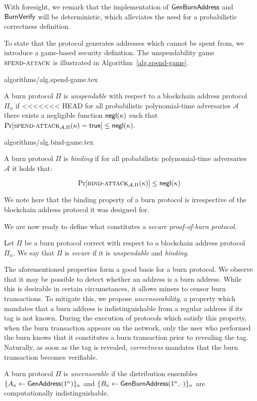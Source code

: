With foresight, we remark that the implementation of $\mathsf{Gen}\-\mathsf{Burn}\-\mathsf{Address}$ and $\mathsf{BurnVerify}$ will be deterministic, which alleviates the need for a probabilistic correctness definition.

To state that the protocol generates addresses which cannot be spent from, we introduce a game-based security definition. The unspendability game $\textsc{spend}\-\text{-}\-\textsc{attack}$ is illustrated in Algorithm~\ref{alg.spend-game}.

{algorithms/alg.spend-game.tex}

\begin{definition}[Unspendability]
  A burn protocol $\Pi$ is \emph{unspendable} with respect to a blockchain address protocol $\Pi_\alpha$ if
<<<<<<< HEAD
  for all probabilistic polynomial-time adversaries $\mathcal{A}$ there exists a negligible function $\textsf{negl}(\kappa)$ such that
  $
    \Pr[\textsc{spend}\-\text{-}\-\textsc{attack}_{\mathcal{A}, \Pi}(\kappa) = \textsf{true}] \leq \textsf{negl}(\kappa)
  $.
\end{definition}

{algorithms/alg.bind-game.tex}

\begin{definition}[Binding]
  A burn protocol $\Pi$ is \emph{binding} if
  for all probabilistic polynomial-time adversaries $\mathcal{A}$ it holds that:

  \[
    \Pr[\textsc{bind}\-\text{-}\-\textsc{attack}_{\mathcal{A},\Pi}(\kappa)] \leq \textsf{negl}(\kappa)
  \]
\end{definition}

We note here that the binding property of a burn protocol is irrespective of the blockchain address protocol it was designed for.

We are now ready to define what constitutes a \emph{secure proof-of-burn protocol}.

\begin{definition}[Security]
  Let $\Pi$ be a burn protocol correct with respect to a blockchain address protocol $\Pi_\alpha$. We say that $\Pi$ is \emph{secure} if it is \emph{unspendable} and \emph{binding}.
\end{definition}

The aforementioned properties form a good basis for a burn protocol. We observe that it may be possible to detect whether an address is a burn address. While this is desirable in certain circumstances, it allows miners to censor burn transactions. To mitigate this, we propose \emph{uncensorability}, a property which mandates that a burn address is indistinguishable from a regular address if its tag is not known. During the execution of protocols which satisfy this property, when the burn transaction appears on the network, only the user who performed the burn knows that it constitutes a burn transaction prior to revealing the tag. Naturally, as soon as the tag is revealed, \emph{correctness} mandates that the burn transaction becomes verifiable.

\begin{definition}[Uncensorability]
  A burn protocol $\Pi$ is \emph{uncensorable} if
  the distribution ensembles $\{A_\kappa \gets \mathsf{GenAddress}(1^\kappa)\}_\kappa$ and
  $\{B_\kappa \gets \mathsf{Gen}\-\mathsf{Burn}\-\mathsf{Address}(1^\kappa, \cdot)\}_\kappa$ are computationally indistinguishable.
\end{definition}
